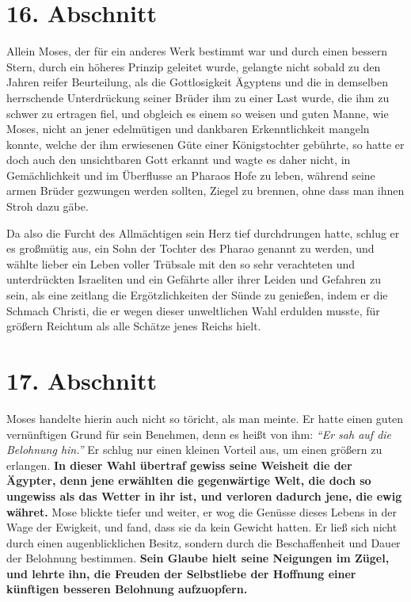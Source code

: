 \section{16. Abschnitt} \label{kap4_ab16}

Allein Moses, der für ein anderes Werk bestimmt war und durch einen bessern
Stern, durch ein höheres Prinzip geleitet wurde, gelangte nicht sobald zu den
Jahren reifer Beurteilung, als die Gottlosigkeit Ägyptens und die in demselben
herrschende Unterdrückung seiner Brüder ihm zu einer Last wurde, die ihm zu
schwer zu ertragen fiel, und obgleich es einem so weisen und guten Manne, wie
Moses, nicht an jener edelmütigen und dankbaren Erkenntlichkeit mangeln
konnte, welche der ihm erwiesenen Güte einer Königstochter gebührte, so hatte er
doch auch den unsichtbaren Gott erkannt und wagte es daher nicht, in
Gemächlichkeit und im Überflusse an Pharaos Hofe zu leben, während seine armen
Brüder gezwungen werden sollten, Ziegel zu brennen, ohne dass man ihnen Stroh
dazu gäbe.

\medskip

Da also die Furcht des Allmächtigen sein Herz tief durchdrungen hatte, schlug er
es großmütig aus, ein Sohn der Tochter des Pharao genannt zu werden, und wählte
lieber ein Leben voller Trübsale mit den so sehr verachteten und unterdrückten
Israeliten und ein Gefährte aller ihrer Leiden und Gefahren zu sein, als eine
zeitlang die Ergötzlichkeiten der Sünde zu genießen, indem er die Schmach
Christi, die er wegen dieser unweltlichen Wahl erdulden musste, für größern
Reichtum als alle Schätze jenes Reichs hielt.

\section{17. Abschnitt} \label{kap4_ab17}

\label{ref:04_17_mose}
Moses handelte hierin auch nicht so töricht, als man meinte. Er hatte einen
guten vernünftigen Grund für sein Benehmen, denn es heißt von ihm:
\textit{"`Er sah auf die Belohnung hin."'}
Er schlug nur einen kleinen
Vorteil aus, um einen größern zu erlangen. \textbf{In dieser Wahl übertraf
gewiss seine
Weisheit die der Ägypter, denn jene erwählten die gegenwärtige Welt, die doch so
ungewiss als das Wetter in ihr ist, und verloren dadurch jene, die ewig währet.}
Mose blickte tiefer und weiter, er wog die Genüsse dieses Lebens in der Wage der
Ewigkeit, und fand, dass sie da kein Gewicht hatten. Er
ließ sich nicht durch
einen augenblicklichen Besitz, sondern durch die Beschaffenheit und Dauer der
Belohnung bestimmen. \textbf{Sein Glaube hielt seine Neigungen im Zügel, und
lehrte ihn,
die Freuden der Selbstliebe der Hoffnung einer künftigen besseren Belohnung
aufzuopfern.}

